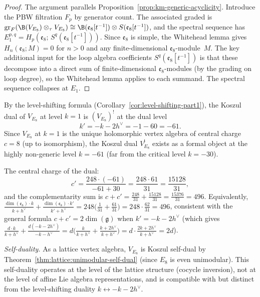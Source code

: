 \begin{proof}
The argument parallels Proposition~\ref{prop:km-generic-acyclicity}.
Introduce the PBW filtration $F_p$ by generator count.  The
associated graded is $\mathrm{gr}_F(\B(V_{E_8}) \otimes_\tau V_{E_8})
\cong \B(\mathfrak{e}_8[t^{-1}]) \otimes S(\mathfrak{e}_8[t^{-1}])$,
and the spectral sequence has
$E_1^{p,q} = H_p(\mathfrak{e}_8;\, S^q(\mathfrak{e}_8[t^{-1}]))$.
Since $\mathfrak{e}_8$ is simple, the Whitehead lemma gives
$H_n(\mathfrak{e}_8; M) = 0$ for $n > 0$ and any finite-dimensional
$\mathfrak{e}_8$-module~$M$.  The key additional input for the
loop algebra coefficients $S^q(\mathfrak{e}_8[t^{-1}])$ is
that these decompose into a direct sum of finite-dimensional
$\mathfrak{e}_8$-modules (by the grading on loop degree),
so the Whitehead lemma applies to each summand.
The spectral sequence collapses at $E_1$.
\end{proof}

\begin{computation}
\label{comp:E8-koszul-dual}
By the level-shifting formula
(Corollary~\ref{cor:level-shifting-part1}),
the Koszul dual of $V_{E_8}$ at level $k = 1$ is
$(V_{E_8})^!$ at the dual level
\[
k' = -k - 2h^\vee = -1 - 60 = -61.
\]
Since $V_{E_8}$ at $k = 1$ is the unique holomorphic vertex algebra
of central charge $c = 8$ (up to isomorphism), the Koszul dual
$V_{E_8}^!$ exists as a formal object at the highly non-generic
level $k = -61$ (far from the critical level $k = -30$).

The central charge of the dual:
\[
c' = \frac{248 \cdot (-61)}{-61 + 30} = \frac{248 \cdot 61}{31} = \frac{15128}{31},
\]
and the complementarity sum is
$c + c' = \frac{248}{31} + \frac{15128}{31} = \frac{15376}{31} = 496$.
Equivalently,
$\frac{\dim(\mathfrak{e}_8) \cdot k}{k+h^\vee} +
\frac{\dim(\mathfrak{e}_8) \cdot k'}{k'+h^\vee}
= 248\bigl(\tfrac{1}{31} + \tfrac{61}{31}\bigr)
= 248 \cdot \tfrac{62}{31} = 496$,
consistent with the general formula
$c + c' = 2\dim(\mathfrak{g})$ when $k' = -k - 2h^\vee$
(which gives $\frac{d \cdot k}{k + h^\vee} + \frac{d(-k-2h^\vee)}{-k-h^\vee}
= d\bigl(\frac{k}{k+h^\vee} + \frac{k+2h^\vee}{k+h^\vee}\bigr)
= d \cdot \frac{2k + 2h^\vee}{k+h^\vee} = 2d$).

\emph{Self-duality.}
As a lattice vertex algebra, $V_{E_8}$ is Koszul self-dual by
Theorem~\ref{thm:lattice:unimodular-self-dual} (since $E_8$ is
even unimodular).  This self-duality operates at the level of the
lattice structure (cocycle inversion), not at the level of affine
Lie algebra representations, and is compatible with but distinct from
the level-shifting duality $k \leftrightarrow -k - 2h^\vee$.
\end{computation}


